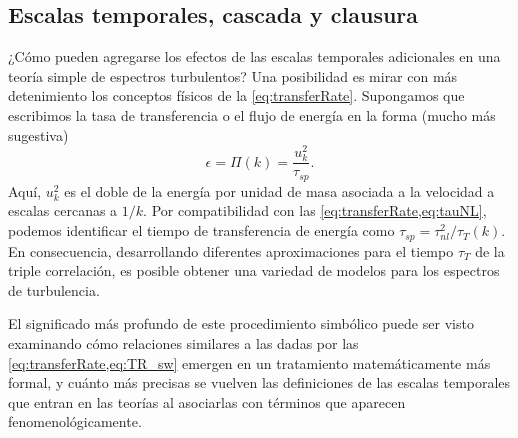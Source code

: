\subsection{Escalas temporales, cascada y clausura}

¿Cómo pueden agregarse los efectos de las escalas temporales
adicionales en una teoría simple de espectros turbulentos? Una
posibilidad es mirar con más detenimiento los conceptos físicos de la
\cref{eq:transferRate}. Supongamos que escribimos la tasa de
transferencia o el flujo de energía en la forma (mucho más sugestiva)
\begin{equation}\label{eq:TR_sw}
  \epsilon = \Pi(k) = \frac{u_k^2}{\tau_{sp}}.
\end{equation}
Aquí, $u_k^2$ es el doble de la energía por unidad de masa asociada a
la velocidad a escalas cercanas a $1/k$. Por compatibilidad con las
\cref{eq:transferRate,eq:tauNL}, podemos identificar el tiempo de
transferencia de energía como $\tau_{sp} = \tau_{nl}^2/\tau_T(k)$. En
consecuencia, desarrollando diferentes aproximaciones para el tiempo
$\tau_T$ de la triple correlación, es posible obtener una variedad de
modelos para los espectros de turbulencia.

El significado más profundo de este procedimiento simbólico puede ser
visto examinando cómo relaciones similares a las dadas por las
\cref{eq:transferRate,eq:TR_sw} emergen en un tratamiento
matemáticamente más formal, y cuánto más precisas se vuelven las
definiciones de las escalas temporales que entran en las teorías al
asociarlas con términos que aparecen fenomenológicamente.

